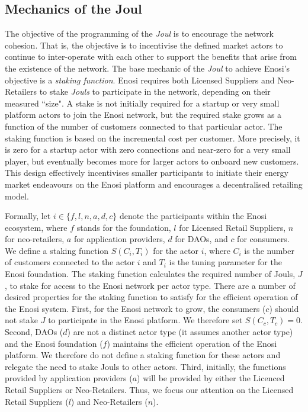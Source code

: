 \documentclass[a4paper,12pt,reqno]{amsart}
\theoremstyle{definition}
\begin{document}
\vspace{-0.3em}

\subsection*{Mechanics of the Joul}
The objective of the programming of the \textit{Joul} is to encourage the network cohesion. That is, the objective is to incentivise the defined market actors to continue to inter-operate with each other to support the benefits that arise from the existence of the network. The base mechanic of the \textit{Joul} to achieve Enosi's objective is a \textit{staking function}. Enosi requires both Licensed Suppliers and Neo-Retailers to stake \textit{Jouls} to participate in the network, depending on their measured ``size". A stake is not initially required for a startup or very small platform actors to join the Enosi network, but the required stake grows as a function of the number of customers connected to that particular actor. The staking function is based on the incremental cost per customer. More precisely, it is zero for a startup actor with zero connections and near-zero for a very small player, but eventually becomes more for larger actors to onboard new customers. This design effectively incentivises smaller participants to initiate their energy market endeavours on the Enosi platform and encourages a decentralised retailing model.

Formally, let $i\in\{f, l, n, a, d, c\}$ denote the participants within the Enosi ecosystem, where $f$ stands for the foundation, $l$ for Licensed  Retail Suppliers, $n$ for neo-retailers, $a$ for application providers, $d$ for DAOs, and $c$ for consumers. We define a staking function $S(C_i, T_i)$ for the actor $i$, where $C_i$ is the number of customers connected to the actor $i$ and $T_i$ is the tuning parameter for the Enosi foundation. The staking function calculates the required number of Jouls, $J$, to stake for access to the Enosi network per actor type. There are a number of desired properties for the staking function to satisfy for the efficient operation of the Enosi system. First, for the Enosi network to grow, the consumers ($c$) should not stake $J$ to participate in the Enosi platform. We therefore set $S(C_c, T_c) = 0$. Second, DAOs ($d$) are not a distinct actor type (it assumes another actor type) and the Enosi foundation ($f$) maintains the efficient operation of the Enosi platform. We therefore do not define a staking function for these actors and relegate the need to stake Jouls to other actors. Third, initially, the functions provided by application providers ($a$) will be provided by either the Licenced Retail Suppliers or Neo-Retailers. Thus, we focus our attention on the Licensed Retail Suppliers ($l$) and Neo-Retailers ($n$). 
\end{document}
